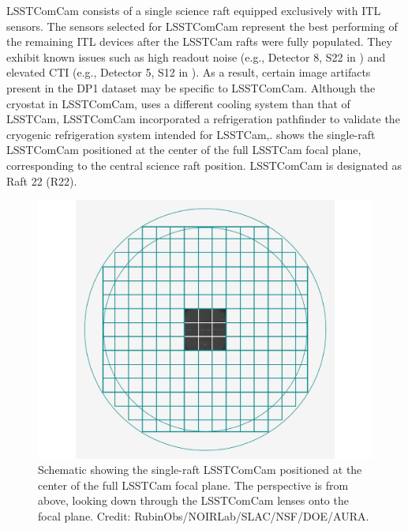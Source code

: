 \gls{LSSTComCam} consists of a single science  \gls{raft} equipped exclusively with \gls{ITL} sensors.
The sensors selected for \gls{LSSTComCam} represent  the best performing of the remaining ITL devices after the \gls{LSSTCam}  \gls{raft}s were fully populated.
They  exhibit known issues such as high readout noise (e.g., Detector 8, S22 in ) and elevated \gls{CTI} (e.g., Detector 5, S12 in ).
As a result, certain image artifacts present in the \gls{DP1} dataset may be specific to LSSTComCam.
Although the cryostat in \gls{LSSTComCam}, uses a different cooling system than that of \gls{LSSTCam}, \gls{LSSTComCam} incorporated a refrigeration pathfinder to validate the cryogenic refrigeration system intended for \gls{LSSTCam},.
 shows the single-raft \gls{LSSTComCam} positioned at the center of the full LSSTCam focal plane, corresponding to the central science \gls{raft} position.
\gls{LSSTComCam} is designated as Raft 22 (R22).
\begin{figure}[htb]
\includegraphics[width=\linewidth]{comcam_raft_in_lsstcam_focal_plane}
\caption{Schematic showing the single-raft LSSTComCam positioned at the center of the full LSSTCam focal plane. The perspective is from above, looking down through the LSSTComCam lenses onto the focal plane.
Credit: RubinObs/NOIRLab/SLAC/NSF/DOE/AURA.}
\label{fig:comcam_raft_in_lsstcam_focal_plane}
\end{figure}

